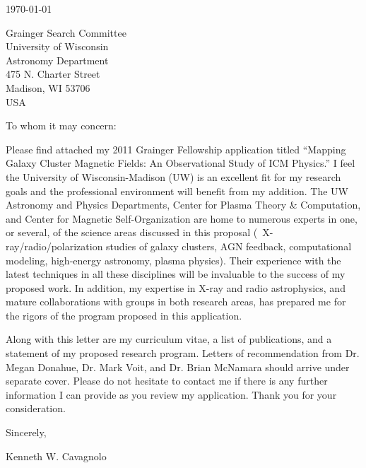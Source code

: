 \documentclass[letterpaper,12pt]{article}
\begin{document}
\today

Grainger Search Committee\\
University of Wisconsin\\
Astronomy Department\\
475 N. Charter Street\\
Madison, WI 53706\\
USA

To whom it may concern:

Please find attached my 2011 Grainger Fellowship application titled
``Mapping Galaxy Cluster Magnetic Fields: An Observational Study of
ICM Physics.'' I feel the University of Wisconsin-Madison (UW) is an
excellent fit for my research goals and the professional environment
will benefit from my addition. The UW Astronomy and Physics
Departments, Center for Plasma Theory \& Computation, and Center for
Magnetic Self-Organization are home to numerous experts in one, or
several, of the science areas discussed in this proposal
(\eg\ X-ray/radio/polarization studies of galaxy clusters, AGN
feedback, computational modeling, high-energy astronomy, plasma
physics). Their experience with the latest techniques in all these
disciplines will be invaluable to the success of my proposed work. In
addition, my expertise in X-ray and radio astrophysics, and mature
collaborations with groups in both research areas, has prepared me for
the rigors of the program proposed in this application.

Along with this letter are my curriculum vitae, a list of
publications, and a statement of my proposed research program. Letters
of recommendation from Dr. Megan Donahue, Dr. Mark Voit, and Dr. Brian
McNamara should arrive under separate cover. Please do not hesitate to
contact me if there is any further information I can provide as you
review my application. Thank you for your consideration.

Sincerely,\\
\begin{minipage}{7.5in}
\end{minipage}
Kenneth W. Cavagnolo
\end{document}
